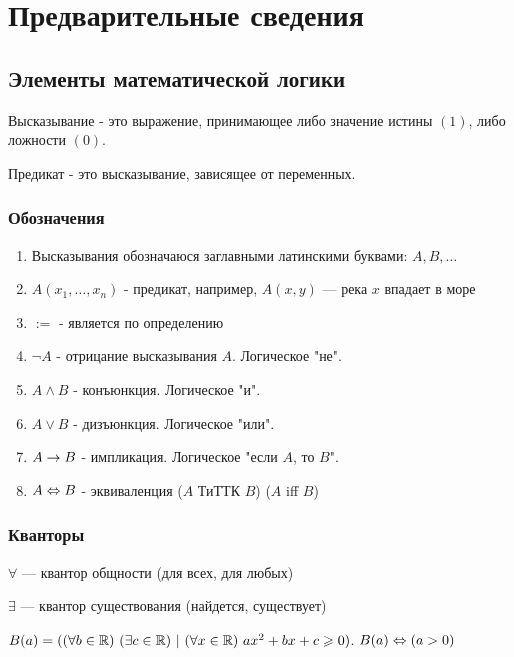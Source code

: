 \section{Предварительные сведения}

\subsection{Элементы математической логики}

\begin{definition}
    Высказывание - это выражение, принимающее либо значение истины $(1)$, либо ложности $(0)$.
\end{definition}

\begin{definition}
    Предикат - это высказывание, зависящее от переменных.
\end{definition}

\subsubsection*{Обозначения}

\begin{enumerate}
    \item Высказывания обозначаюся заглавными латинскими буквами: $A, B, \dots$
    \item $A(x_1, \dots, x_n)$ - предикат, например, $A(x, y)$ --- река $x$ впадает в море
    \item $:=$ - является по определению
    \item $\neg A$ - отрицание высказывания $A$. Логическое "не".
    \item $A \wedge B$ - конъюнкция. Логическое "и".
    \item $A \vee B$ - дизъюнкция. Логическое "или".
    \item $A \rightarrow B$ - импликация. Логическое "если $A$, то $B$".
    \item $A \Leftrightarrow B$ - эквиваленция ($A$ ТиТТК $B$) ($A$ iff $B$)
\end{enumerate}

\subsubsection*{Кванторы}

$\forall$ --- квантор общности (для всех, для любых)

$\exists$ --- квантор существования (найдется, существует)


\begin{example}[предиката]
    $B(a) = ((\forall b \in \mathbb{R})\ (\exists c \in \mathbb{R})\ |\ (\forall x \in \mathbb{R})\ ax^2 + bx + c \geqslant 0) $.  $B(a) \Leftrightarrow (a > 0)$
\end{example}


